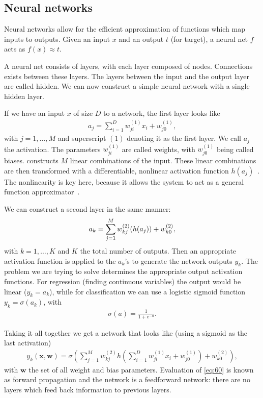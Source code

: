 \documentclass[11pt, a4paper]{report} %
\begin{document}
\subsection{Neural networks}\label{sec:neural-networks}
Neural networks allow for the efficient approximation of functions which map inputs to outputs.
Given an input \(x\) and an output \(t\) (for target), a neural net \(f\) acts as \(f(x)\approx t\).

A neural net consists of layers, with each layer composed of nodes.
Connections exists between these layers.
The layers between the input and the output layer are called hidden.
We can now construct a simple neural network with a single hidden layer.

If we have an input \(x\) of size \(D\) to a network, the first layer looks like
\begin{align}
  \label{eq:57}
  a_j = \sum_{i=1}^D w_{ji}^{(1)}x_i + w_{j0}^{(1)},
\end{align}
with \(j=1,\ldots,M\) and superscript \((1)\) denoting it as the first layer.
We call \(a_j\) the activation.
The parameters \(w_{ji}^{(1)}\) are called weights, with \(w_{j0}^{(1)}\) being called biases.
 constructs \(M\) linear combinations of the input.
These linear combinations are then transformed with a differentiable, nonlinear activation function \(h(a_j)\)~\cite{Bishop2006}.
The nonlinearity is key here, because it allows the system to act as a general function approximator~\cite{Sutton}.

We can construct a second layer in the same manner:
\begin{align}
  \label{eq:58}
  a_k = \sum_{j=1}^M w_{kj}^{(2)}\qty(h(a_j)) + w_{k0}^{(2)},
\end{align}
with \(k=1,\ldots,K\) and \(K\) the total number of outputs.
Then an appropriate activation function is applied to the \(a_k\)'s to generate the network outputs \(y_k\).
The problem we are trying to solve determines the appropriate output activation functions.
For regression (finding continuous variables) the output would be linear (\(y_k=a_k\)), while for classification we can use a logistic sigmoid function \(y_k=\sigma(a_k)\), with
\begin{align}
  \label{eq:59}
  \sigma (a) = \frac{1}{1+e^{-a}}.
\end{align}

Taking it all together we get a network that looks like (using a sigmoid as the last activation)
\begin{align}
  \label{eq:60}
  y_k(\mathbf{x},\mathbf{w}) = \sigma\left(\sum_{j=1}^M w_{kj}^{(2)}h\left(\sum_{i=1}^D w_{ji}^{(1)}x_i+w_{j0}^{(1)}\right)+w_{k0}^{(2)}\right),
\end{align}
with \(\mathbf{w}\) the set of all weight and bias parameters.
Evaluation of \cref{eq:60} is known as forward propagation and the network is a feedforward network: there are no layers which feed back information to previous layers.
\end{document}
